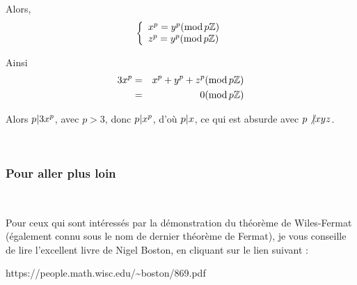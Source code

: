 \

\

Alors,
\[ \left\{\begin{array}{l}
     x^p = y^p  (\operatorname{mod} p\mathbb{Z})\\
     z^p = y^p  (\operatorname{mod} p\mathbb{Z})
   \end{array}\right. \]


Ainsi
\begin{eqnarray*}
  3 x^p & = & x^p + y^p + z^p (\operatorname{mod} p\mathbb{Z})\\
  & = & 0 (\operatorname{mod} p\mathbb{Z})
\end{eqnarray*}


Alors $p | 3 x^p $, avec $p > 3$, donc $p | x^p $,
d'o{\`u} $p | x $, ce qui est absurde avec $p \not{| } x y
z$.

\

\subsubsection*{Pour aller plus loin{\textdots}}

\

Pour ceux qui sont int{\'e}ress{\'e}s par la d{\'e}monstration du
th{\'e}or{\`e}me de Wiles-Fermat ({\'e}galement connu sous le nom de dernier
th{\'e}or{\`e}me de Fermat), je vous conseille de lire l'excellent livre
{} de Nigel Boston, en cliquant sur
le lien suivant :

\begin{center}
  https://people.math.wisc.edu/\~{}boston/869.pdf
\end{center}